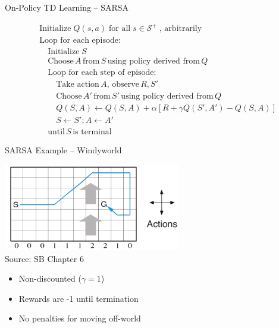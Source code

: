 \documentclass[ignorenonframetext,xcolor=x11names]{beamer}
\begin{document}

\begin{frame}{On-Policy TD Learning -- SARSA}
\begin{block}{}
\begin{align*}
& \text{Initialize}\; Q(s, a) \; \text{for all} \; s \in \mathcal{S}^+ \; \text{, arbitrarily} \\
& \text{Loop for each episode:} \\
& \quad \text{Initialize}\; S \\
& \quad \text{Choose} \, A \, \text{from}\, S \, \text{using policy derived from} \, Q \\
& \quad \text{Loop for each step of episode:} \\
& \quad \quad \text{Take action}\, A, \, \text{observe} \, R, S' \\
& \quad \quad \text{Choose}\, A' \, \text{from}\, S' \, \text{using policy derived from} \, Q \\ 
& \quad \quad Q(S, A) \leftarrow Q(S, A) + \alpha \left[ R + \gamma Q(S', A') - Q(S, A) \right] \\
& \quad \quad S \leftarrow S'; A \leftarrow A' \\
& \quad \text{until}\, S\, \text{is terminal}
\end{align*}
\end{block}
\end{frame}

\begin{frame}{SARSA Example -- Windyworld}
\begin{center}
\includegraphics[height=1.5in]{screen6} \\
\scriptsize Source: SB Chapter 6 \normalsize 
\end{center}
\begin{itemize}
   \item Non-discounted ($\gamma = 1$)
   \item Rewards are -1 until termination
   \item No penalties for moving off-world
\end{itemize}
\end{frame}
\end{document}
